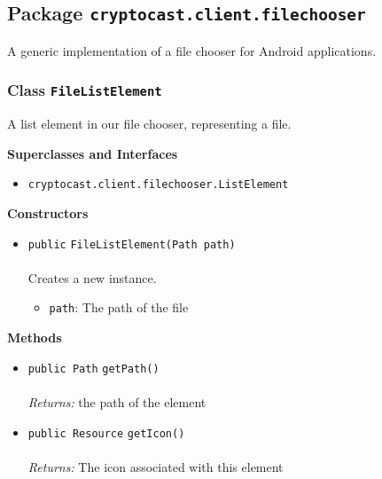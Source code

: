 \subsection{Package \lstinline!cryptocast.client.filechooser!}
A generic implementation of a file chooser for Android applications.
\subsubsection{Class \lstinline|FileListElement|}
A list element in our file chooser, representing a file. \\
\noindent\begin{minipage}[t]{5cm}
\vspace{0.3em}
\hspace*{2em}
\vspace{0.3em}
\end{minipage}



\textbf{\sffamily Superclasses and Interfaces}
\begin{itemize}
\item \lstinline|cryptocast.client.filechooser.ListElement|
\end{itemize}


\textbf{\sffamily Constructors}
\begin{itemize}
\item \lstinline|public| \lstinline|FileListElement|\lstinline|(Path path)|\\ \\[-0.6em]
Creates a new instance.
\begin{itemize}
\item \lstinline|path|: The path of the file
\end{itemize}



\end{itemize}


\textbf{\sffamily Methods}
\begin{itemize}
\item \lstinline|public Path| \lstinline|getPath|\lstinline|()|\\ \\[-0.6em]
\emph{Returns:} the path of the element



\item \lstinline|public Resource| \lstinline|getIcon|\lstinline|()|\\ \\[-0.6em]
\emph{Returns:} The icon associated with this element



\end{itemize}

